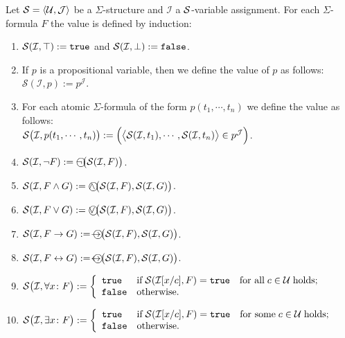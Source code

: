 \begin{Definition}
    Let $\mathcal{S} = \langle \mathcal{U}, \mathcal{J} \rangle$ be a $\Sigma$-structure and $\mathcal{I}$ a $\mathcal{S}$-variable assignment.  
    For each $\Sigma$-formula $F$ the value  is defined
    by induction:
    \begin{enumerate}
    \item $\mathcal{S}(\mathcal{I},\top) := \mathtt{true}$ and $\mathcal{S}(\mathcal{I},\bot) := \mathtt{false}$.
    \item If $p$ is a propositional variable, then we define the value of $p$ as follows:
          \\[0.2cm]
          \hspace*{1.3cm}
          $\mathcal{S}(\mathcal{I}, p) := p^\mathcal{J}$.
    \item For each atomic $\Sigma$-formula of the form $p(t_1, \cdots, t_n)$ we define the value  as follows: \\[0.2cm]
          \hspace*{1.3cm}
          $\mathcal{S}\bigl(\mathcal{I}, p(t_1,\cdots,t_n)\bigr) := 
          \Bigl(\bigl\langle \mathcal{S}(\mathcal{I}, t_1), \cdots, \mathcal{S}(\mathcal{I}, t_n) \bigr\rangle \in p^\mathcal{J}\Bigr)$.
    \item $\struct(\mathcal{I}, \neg F) := \circneg\bigl(\struct(\mathcal{I}, F)\bigr)$.
    \item $\struct(\mathcal{I}, F \wedge G) := \circwedge\bigl(\struct(\mathcal{I}, F), \struct(\mathcal{I}, G)\bigr)$.
    \item $\struct(\mathcal{I}, F \vee G) := \circvee\bigl(\struct(\mathcal{I}, F), \struct(\mathcal{I}, G)\bigr)$.
    \item $\struct(\mathcal{I}, F \rightarrow G) := \circright\bigl(\struct(\mathcal{I}, F), \struct(\mathcal{I}, G)\bigr)$.
    \item $\struct(\mathcal{I}, F \leftrightarrow G) := \circleftright\bigl(\struct(\mathcal{I}, F), \struct(\mathcal{I}, G)\bigr)$.
    \item $\mathcal{S}\bigl(\mathcal{I}, \forall x\colon F\bigr) := \left\{
      \begin{array}{ll}
         \mathtt{true}  & \mbox{if}\; \mathcal{S}(\mathcal{I}[x/c], F) = \mathtt{true}\quad \mbox{for all}\; c\in \mathcal{U}\;\mbox{holds}; \\
         \mathtt{false} & \mbox{otherwise}.
      \end{array}
      \right.$
    \item $\mathcal{S}\bigl(\mathcal{I}, \exists x \colon F\bigr) := \left\{
      \begin{array}{ll}
         \mathtt{true}  & \mbox{if}\; \mathcal{S}(\mathcal{I}[x/c], F) = \mathtt{true}\quad \mbox{for some}\; c\in \mathcal{U}\;\mbox{holds}; \\
         \mathtt{false} & \mbox{otherwise}.
      \end{array}
      \right.$\eox    
    \end{enumerate}
\end{Definition}


